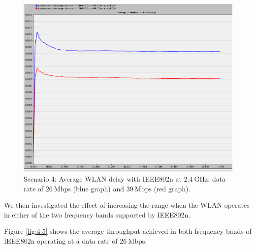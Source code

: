 \begin{figure}[H]
	\centering
	\includegraphics[scale=0.3]{Figures/amantianrenamed/Scenario4Avedelayof39Mbpand26Mbps.png}
	\caption[Scenario 4: average delay at data rates of $26~\mathrm{Mbps}$ and $39~\mathrm{Mbps}$]{Scenario 4: Average \gls{WLAN} delay with \gls{IEEE802}n at $2.4~\mathrm{GHz}$: data rate of $26~\mathrm{Mbps}$ (blue graph) and $39~\mathrm{Mbps}$ (red graph).}
	\label{fig:4:4}
\end{figure}

We then investigated the effect of increasing the range when the \gls{WLAN} operates in either of the two frequency bands supported by \gls{IEEE802}n.

Figure \ref{fig:4:5} shows the average throughput achieved in both frequency bands of \gls{IEEE802}n operating at a data rate of $26~\mathrm{Mbps}$.

